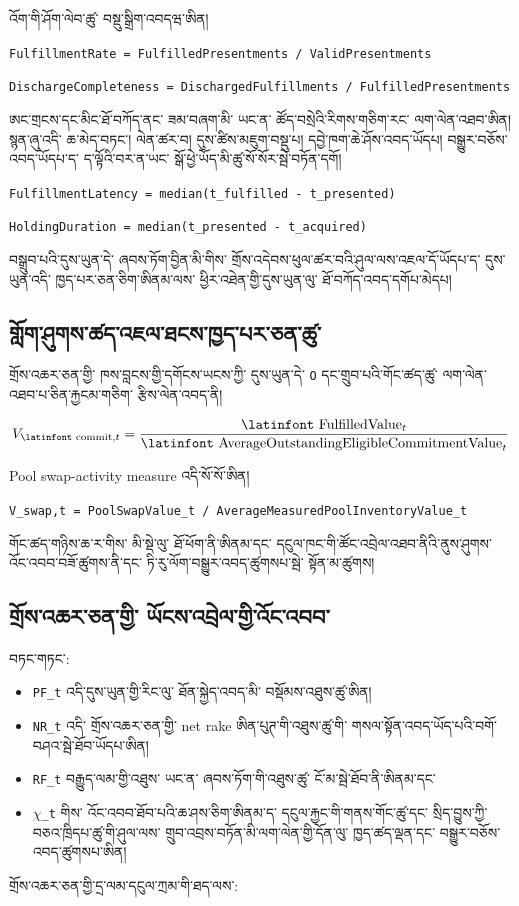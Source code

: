 \documentclass[11pt]{article}
\begin{document}
འོག་གི་ཤོག་ལེབ་ཚུ་ བསྡུ་སྒྲིག་འབདཝ་ཨིན།

\texttt{FulfillmentRate = FulfilledPresentments / ValidPresentments}

\texttt{DischargeCompleteness = DischargedFulfillments / FulfilledPresentments}

ཨང་གྲངས་དང་མིང་ཐོ་བཀོད་ནང་ ཟམ་བཞག་མི་ ཡང་ན་ ཚོད་བསྲེའི་རིགས་གཅིག་རང་ ལག་ལེན་འཐབ་ཨིན། སྙན་ཞུ་འདི་ ཆ་མེད་བཏང་། ལེན་ཚར་བ། དུས་ཚིས་མཇུག་བསྡུ་པ། དབྱེ་ཁག་ཆེ་ཤོས་འབད་ཡོདཔ། བསྒྱུར་བཅོས་འབད་ཡོདཔ་ད་ ད་ལྟོའི་བར་ན་ཡང་ སྒོ་ཕྱེ་ཡོད་མི་ཚུ་སོ་སོར་སྦེ་བཏོན་དགོ།

\texttt{FulfillmentLatency = median(t\_fulfilled - t\_presented)}

\texttt{HoldingDuration = median(t\_presented - t\_acquired)}

བསྒྲུབ་པའི་དུས་ཡུན་དེ་ ཞབས་ཏོག་བྱིན་མི་གིས་ གྲོས་འདེབས་ཕུལ་ཚར་བའི་ཤུལ་ལས་འཇལ་དོ་ཡོདཔ་ད་ དུས་ཡུན་འདི་ ཁྱད་པར་ཅན་ཅིག་ཨིནམ་ལས་ ཕྱིར་འཐེན་གྱི་དུས་ཡུན་ལུ་ ཐོ་བཀོད་འབད་དགོཔ་མེདཔ།

\subsection*{གློག་ཤུགས་ཚད་འཇལ་ཐངས་ཁྱད་པར་ཅན་ཚུ་}

གྲོས་འཆར་ཅན་གྱི་ ཁས་བླངས་གྱི་དགོངས་ཡངས་ཀྱི་ དུས་ཡུན་དེ་ \texttt{O} དང་གྲུབ་པའི་གོང་ཚད་ཚུ་ ལག་ལེན་འཐབ་པ་ཅིན་རྐྱངམ་གཅིག་ རྩིས་ལེན་འབད་ནི།

\[
V_{\text{\latinfont commit},t} = \frac{\text{\latinfont FulfilledValue}_t}{\text{\latinfont AverageOutstandingEligibleCommitmentValue}_t}
\]

Pool swap-activity measure འདི་སོ་སོ་ཨིན།

\texttt{V\_swap,t = PoolSwapValue\_t / AverageMeasuredPoolInventoryValue\_t}

གོང་ཚད་གཉིས་ཆ་ར་གིས་ མི་སྡེ་ལུ་ ཐོ་ཕོག་ནི་ཨིནམ་དང་ དངུལ་ཁང་གི་ཚོང་འབྲེལ་འཐབ་ནིའི་ནུས་ཤུགས་ འོང་འབབ་བཟོ་ཚུགས་ནི་དང་ ཏི་རུ་ལོག་བསྒྱུར་འབད་ཚུགསཔ་སྦེ་ སྟོན་མ་ཚུགས།

\subsection*{གྲོས་འཆར་ཅན་གྱི་ ཡོངས་འབྲེལ་གྱི་འོང་འབབ་}

བཏང་གཏང་:

\begin{itemize}[leftmargin=*]
\item \texttt{PF\_t} འདི་དུས་ཡུན་གྱི་རིང་ལུ་ ཐོན་སྐྱེད་འབད་མི་ བསྡོམས་འཐུས་ཚུ་ཨིན།
\item \texttt{NR\_t} འདི་ གྲོས་འཆར་ཅན་གྱི་ net rake ཨིན་པུཊ་གི་འཐུས་ཚུ་གི་ གསལ་སྟོན་འབད་ཡོད་པའི་བགོ་བཤའ་སྦེ་ཐོབ་ཡོདཔ་ཨིན།
\item \texttt{RF\_t} བརྒྱུད་ལམ་གྱི་འཐུས་ ཡང་ན་ ཞབས་ཏོག་གི་འཐུས་ཚུ་ ངོ་མ་སྦེ་ཐོབ་ནི་ཨིནམ་དང་
\item \texttt{$\chi$\_t} གིས་ འོང་འབབ་ཐོབ་པའི་ཆ་ཤས་ཅིག་ཨིནམ་ད་ དངུལ་རྐྱང་གི་གནས་གོང་ཚུ་དང་ སྲིད་བྱུས་ཀྱི་བཅའ་ཁྲིདཔ་ཚུ་གི་ཤུལ་ལས་ གྲུབ་འབྲས་བཏོན་མི་ལག་ལེན་གྱི་དོན་ལུ་ ཁྱད་ཚད་ལྡན་དང་ བསྒྱུར་བཅོས་འབད་ཚུགསཔ་ཨིན།
\end{itemize}
གྲོས་འཆར་ཅན་གྱི་དྲ་ལམ་དངུལ་ཀྲམ་གི་ཐད་ལས་:
\end{document}
